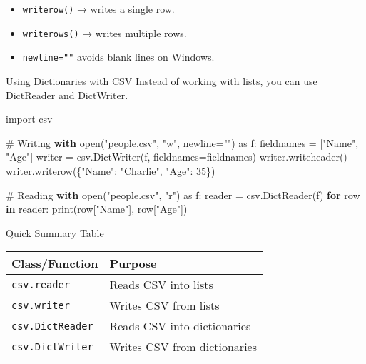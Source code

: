 \documentclass[
  letterpaper,
  DIV=11,
  numbers=noendperiod]{scrreprt}
\newenvironment{Shaded}{\begin{snugshade}}{\end{snugshade}}
\newcommand{\BuiltInTok}[1]{\textcolor[rgb]{0.00,0.23,0.31}{#1}}
\newcommand{\CommentTok}[1]{\textcolor[rgb]{0.37,0.37,0.37}{#1}}
\newcommand{\ControlFlowTok}[1]{\textcolor[rgb]{0.00,0.23,0.31}{\textbf{#1}}}
\newcommand{\DecValTok}[1]{\textcolor[rgb]{0.68,0.00,0.00}{#1}}
\newcommand{\ImportTok}[1]{\textcolor[rgb]{0.00,0.46,0.62}{#1}}
\newcommand{\KeywordTok}[1]{\textcolor[rgb]{0.00,0.23,0.31}{\textbf{#1}}}
\newcommand{\NormalTok}[1]{\textcolor[rgb]{0.00,0.23,0.31}{#1}}
\newcommand{\OperatorTok}[1]{\textcolor[rgb]{0.37,0.37,0.37}{#1}}
\newcommand{\StringTok}[1]{\textcolor[rgb]{0.13,0.47,0.30}{#1}}
\providecommand{\tightlist}{%
  \setlength{\itemsep}{0pt}\setlength{\parskip}{0pt}}
\begin{document}
\begin{itemize}
\tightlist
\item
  \texttt{writerow()} → writes a single row.
\item
  \texttt{writerows()} → writes multiple rows.
\item
  \texttt{newline=""} avoids blank lines on Windows.
\end{itemize}

Using Dictionaries with CSV Instead of working with lists, you can use
DictReader and DictWriter.

\begin{Shaded}
\begin{Highlighting}[]
\ImportTok{import}\NormalTok{ csv}

\CommentTok{\# Writing}
\ControlFlowTok{with} \BuiltInTok{open}\NormalTok{(}\StringTok{"people.csv"}\NormalTok{, }\StringTok{"w"}\NormalTok{, newline}\OperatorTok{=}\StringTok{""}\NormalTok{) }\ImportTok{as}\NormalTok{ f:}
\NormalTok{    fieldnames }\OperatorTok{=}\NormalTok{ [}\StringTok{"Name"}\NormalTok{, }\StringTok{"Age"}\NormalTok{]}
\NormalTok{    writer }\OperatorTok{=}\NormalTok{ csv.DictWriter(f, fieldnames}\OperatorTok{=}\NormalTok{fieldnames)}
\NormalTok{    writer.writeheader()}
\NormalTok{    writer.writerow(\{}\StringTok{"Name"}\NormalTok{: }\StringTok{"Charlie"}\NormalTok{, }\StringTok{"Age"}\NormalTok{: }\DecValTok{35}\NormalTok{\})}

\CommentTok{\# Reading}
\ControlFlowTok{with} \BuiltInTok{open}\NormalTok{(}\StringTok{"people.csv"}\NormalTok{, }\StringTok{"r"}\NormalTok{) }\ImportTok{as}\NormalTok{ f:}
\NormalTok{    reader }\OperatorTok{=}\NormalTok{ csv.DictReader(f)}
    \ControlFlowTok{for}\NormalTok{ row }\KeywordTok{in}\NormalTok{ reader:}
        \BuiltInTok{print}\NormalTok{(row[}\StringTok{"Name"}\NormalTok{], row[}\StringTok{"Age"}\NormalTok{])}
\end{Highlighting}
\end{Shaded}

Quick Summary Table

\begin{longtable}[]{@{}ll@{}}
\toprule\noalign{}
Class/Function & Purpose \\
\midrule\noalign{}
\endhead
\bottomrule\noalign{}
\endlastfoot
\texttt{csv.reader} & Reads CSV into lists \\
\texttt{csv.writer} & Writes CSV from lists \\
\texttt{csv.DictReader} & Reads CSV into dictionaries \\
\texttt{csv.DictWriter} & Writes CSV from dictionaries \\
\end{longtable}
\end{document}
